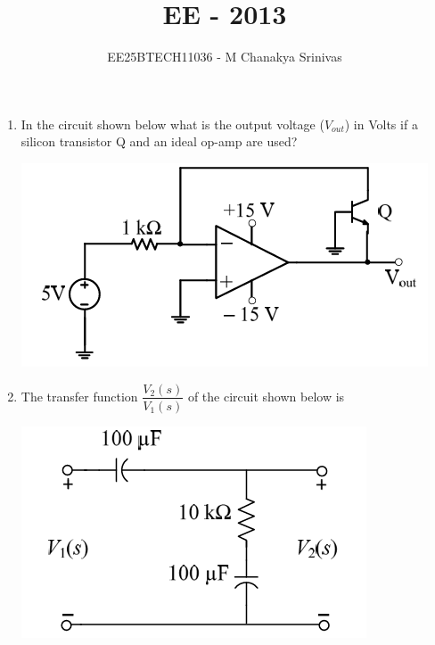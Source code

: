 \documentclass[journal,12pt,onecolumn]{IEEEtran}
\title{\LARGE \textbf{EE - 2013}}
\author{\Large EE25BTECH11036 - M Chanakya Srinivas}
\date{}
\theoremstyle{remark}
\begin{document}
\maketitle


\begin{enumerate}

\item In the circuit shown below what is the output voltage ($V_{out}$) in Volts if a silicon transistor Q and an ideal op-amp are used?

\begin{center}
\includegraphics[width=0.5\columnwidth]{figs/1.png}
   \label{fig:placeholder}
\end{center}

\begin{enumerate} 
 \end{enumerate}

\item The transfer function $\dfrac{V_{2}(s)}{V_{1}(s)}$ of the circuit shown below is

\begin{center}
\includegraphics[width=0.5\columnwidth]{figs/2.png} 
   \label{fig:placeholder}
\end{center}

\begin{enumerate} 
\end{enumerate}


\end{enumerate}
\end{document}
